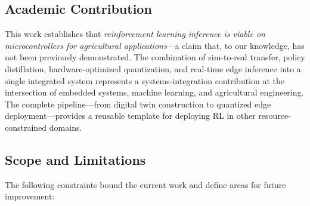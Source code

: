 \documentclass[conference]{IEEEtran}
\begin{document}
    \subsection{Academic Contribution}

    This work establishes that \textit{reinforcement learning inference is viable on microcontrollers for agricultural applications}---a claim that, to our knowledge, has not been previously demonstrated. The combination of sim-to-real transfer, policy distillation, hardware-optimized quantization, and real-time edge inference into a single integrated system represents a systems-integration contribution at the intersection of embedded systems, machine learning, and agricultural engineering. The complete pipeline---from digital twin construction to quantized edge deployment---provides a reusable template for deploying RL in other resource-constrained domains.

    \subsection{Scope and Limitations}

    The following constraints bound the current work and define areas for future improvement:
\end{document}
